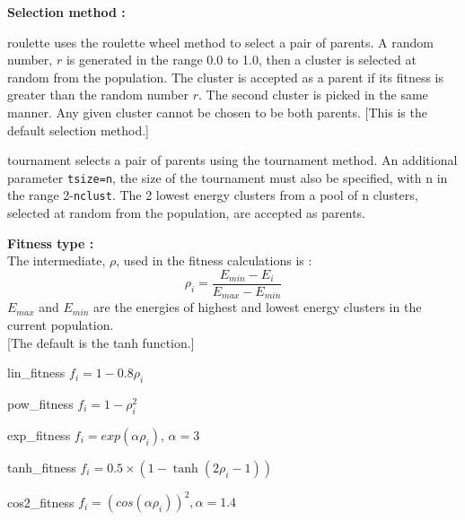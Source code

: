 \documentclass[12pt,a4paper]{article}
\newenvironment{entry}[1]
{\begin{list}{}{\renewcommand{\makelabel}[1]{~~\texttt{##1 :}\hfil}
      \setlength{\labelwidth}{90pt}
      \setlength{\leftmargin}{\labelwidth+\labelsep}}}
{\end{list}}
\begin{document}
\noindent \textbf{Selection method :}
\begin{entry}{a}
\item[roulette] uses the roulette wheel method to select a pair of parents. A random number, $r$ is generated in the range 0.0 to 1.0, then a cluster is selected at random from the population. The cluster is accepted as a parent if its fitness is greater than the random number $r$. The second cluster is picked in the same manner. Any given cluster cannot be chosen to be both parents. [This is the default selection method.]
\item[tournament] selects a pair of parents using the tournament method. An additional parameter \texttt{tsize=n}, the size of the tournament must also be specified, with n in the range 2-\texttt{nclust}. The 2 lowest energy clusters from a pool of n clusters, selected at random from the population, are accepted as parents.
\end{entry}

\noindent \textbf{Fitness type :} ~\\ [1ex]
The intermediate, $\rho$, used in the fitness calculations is :
\begin{equation*}
\rho_{i} = \frac{E_{min}-E_{i}}{E_{max}-E_{min}}
\end{equation*}
$E_{max}$ and $E_{min}$ are the energies of highest and lowest energy clusters in the current population. ~\\ [1ex]
[The default is the tanh function.]
\begin{entry}{a}
\item[lin\_fitness] $f_{i}=1-0.8\rho_{i}$
\item[pow\_fitness] $f_{i}=1-\rho_{i}^{2}$
\item[exp\_fitness] $f_{i}=exp(\alpha\rho_{i})$, $\alpha=3$
\item[tanh\_fitness] $f_{i}=0.5\times(1-\tanh(2\rho_{i}-1))$
\item[cos2\_fitness] $f_{i}=(cos(\alpha\rho_{i}))^{2},\alpha=1.4$
\end{entry}
\end{document}
